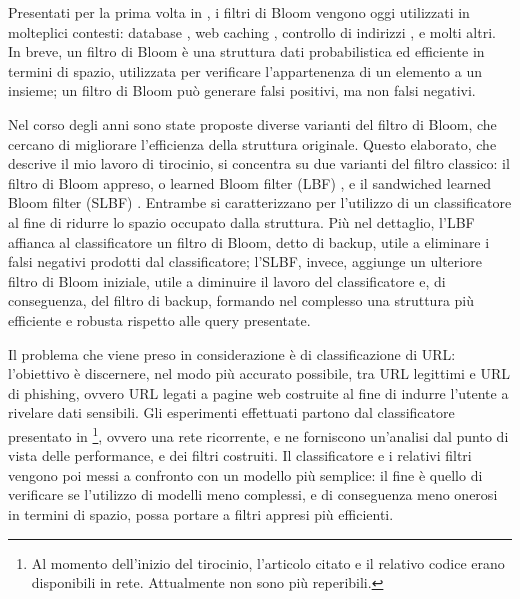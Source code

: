 \documentclass[4apaper,11pt]{article}
\begin{document}
Presentati per la prima volta in \cite{Bloom1970SpacetimeTI}, i filtri di Bloom vengono oggi utilizzati in molteplici contesti: database \cite{kraska2018case}, web caching \cite{Maggs15algorithmicnuggets}, controllo di indirizzi \cite{Dharmapurikar2006LongestPM}, e molti altri. In breve, un filtro di Bloom è una struttura dati probabilistica ed efficiente in termini di spazio, utilizzata per verificare l'appartenenza di un elemento a un insieme; un filtro di Bloom può generare falsi positivi, ma non falsi negativi.

Nel corso degli anni sono state proposte diverse varianti del filtro di Bloom, che cercano di migliorare l'efficienza della struttura originale. Questo elaborato, che descrive il mio lavoro di tirocinio, si concentra su due varianti del filtro classico: il filtro di Bloom appreso, o learned Bloom filter (LBF) \cite{kraska2018case}, e il sandwiched learned Bloom filter (SLBF) \cite{10.5555/3326943.3326986}. Entrambe si caratterizzano per l'utilizzo di un classificatore al fine di ridurre lo spazio occupato dalla struttura. Più nel dettaglio, l'LBF affianca al classificatore un filtro di Bloom, detto di backup, utile a eliminare i falsi negativi prodotti dal classificatore; l'SLBF, invece, aggiunge un ulteriore filtro di Bloom iniziale, utile a diminuire il lavoro del classificatore e, di conseguenza, del filtro di backup, formando nel complesso una struttura più efficiente e robusta rispetto alle query presentate.

Il problema che viene preso in considerazione è di classificazione di URL: l'obiettivo è discernere, nel modo più accurato possibile, tra URL legittimi e URL di phishing, ovvero URL legati a pagine web costruite al fine di indurre l'utente a rivelare dati sensibili. Gli esperimenti effettuati partono dal classificatore presentato in \cite{ma2020}\footnote{Al momento dell'inizio del tirocinio, l'articolo citato e il relativo codice erano disponibili in rete. Attualmente non sono più reperibili.}, ovvero una rete ricorrente, e ne forniscono un'analisi dal punto di vista delle performance, e dei filtri costruiti. Il classificatore e i relativi filtri vengono poi messi a confronto con un modello più semplice: il fine è quello di verificare se l'utilizzo di modelli meno complessi, e di conseguenza meno onerosi in termini di spazio, possa portare a filtri appresi più efficienti.
\end{document}

